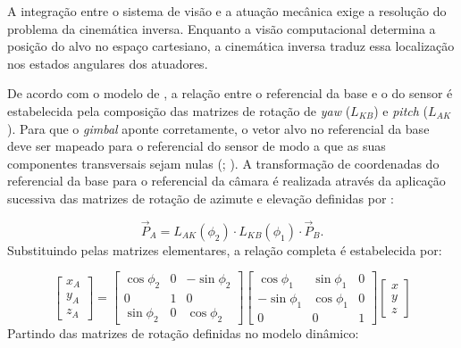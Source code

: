 A integração entre o sistema de visão e a atuação mecânica exige a resolução do problema da cinemática inversa. Enquanto a visão computacional determina a posição do alvo no espaço cartesiano, a cinemática inversa traduz essa localização nos estados angulares dos atuadores.

De acordo com o modelo de \cite{equations2001}, a relação entre o referencial da base e o do sensor é estabelecida pela composição das matrizes de rotação de \emph{yaw} ($L_{KB}$) e \emph{pitch} ($L_{AK}$). Para que o \emph{gimbal} aponte corretamente, o vetor alvo no referencial da base deve ser mapeado para o referencial do sensor de modo a que as suas componentes transversais sejam nulas (\cite{equations2001}; \cite{bolton2018}).  A transformação de coordenadas do referencial da base para o referencial da câmara é realizada através da aplicação sucessiva das matrizes de rotação de azimute e elevação definidas por \cite{equations2001}:

\begin{equation}
    \vec{P}_A = L_{AK}(\phi_2) \cdot L_{KB}(\phi_1) \cdot \vec{P}_B.
\end{equation}
Substituindo pelas matrizes elementares, a relação completa é estabelecida por:

\begin{equation}
    \begin{bmatrix} x_A \\ y_A \\ z_A \end{bmatrix} = 
    \begin{bmatrix} \cos\phi_2 & 0 & -\sin\phi_2 \\ 0 & 1 & 0 \\ \sin\phi_2 & 0 & \cos\phi_2 \end{bmatrix}
    \begin{bmatrix} \cos\phi_1 & \sin\phi_1 & 0 \\ -\sin\phi_1 & \cos\phi_1 & 0 \\ 0 & 0 & 1 \end{bmatrix}
    \begin{bmatrix} x \\ y \\ z \end{bmatrix}
\end{equation}
Partindo das matrizes de rotação definidas no modelo dinâmico:

